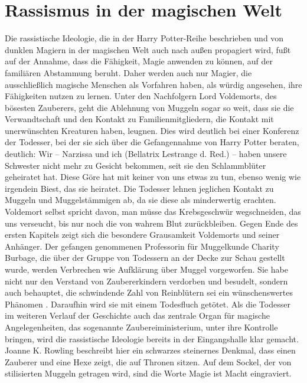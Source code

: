 \section{Rassismus in der magischen Welt}
Die rassistische Ideologie, die in der \glqq Harry Potter\grqq-Reihe beschrieben und von dunklen Magiern in der magischen Welt auch nach außen propagiert wird, fußt auf der Annahme, dass die Fähigkeit, Magie anwenden zu können, auf der familiären Abstammung beruht.
Daher werden auch nur Magier, die ausschließlich magische Menschen als Vorfahren haben, als würdig angesehen, ihre Fähigkeiten nutzen zu lernen.
Unter den Nachfolgern Lord Voldemorts, des bösesten Zauberers, geht die Ablehnung von Muggeln sogar so weit, dass sie die Verwandtschaft und den Kontakt zu Familienmitgliedern, die Kontakt mit \glqq unerwünschten\grqq{} Kreaturen haben, leugnen.
Dies wird deutlich bei einer Konferenz der Todesser, bei der sie sich über die Gefangennahme von Harry Potter beraten, deutlich: \glqq Wir – Narzissa und ich (Bellatrix Lestrange d. Red.) – haben unsere Schwester nicht mehr zu Gesicht bekommen, seit sie den Schlammblüter geheiratet hat. Diese Göre hat mit keiner von uns etwas zu tun, ebenso wenig wie irgendein Biest, das sie heiratet.\grqq{}\cite[S.18]{JKR10}
Die Todesser lehnen jeglichen Kontakt zu Muggeln und Muggelstämmigen ab, da sie diese als minderwertig erachten.
Voldemort selbst spricht davon, man müsse \glqq das Krebsgeschwür wegschneiden, das uns verseucht, bis nur noch die von wahrem Blut zurückbleiben.\grqq{}\cite[S.19]{JKR10} 
Gegen Ende des ersten Kapitels zeigt sich die besondere Grausamkeit Voldemorts und seiner Anhänger. 
Der gefangen genommenen Professorin für \glqq Muggelkunde\grqq{} Charity Burbage, die über der Gruppe von Todessern an der Decke zur Schau gestellt wurde, werden \glqq Verbrechen\grqq{} wie Aufklärung über Muggel vorgeworfen. 
Sie habe nicht nur \glqq den Verstand von Zaubererkindern\grqq{} verdorben und besudelt, sondern auch behauptet, die schwindende Zahl von Reinblütern sei ein \glqq wünschenswertes Phänomen\grqq{} \cite[S.19]{JKR10}. 
Daraufhin wird sie mit einem Todesfluch getötet.
Als die Todesser im weiteren Verlauf der Geschichte auch das zentrale Organ für magische Angelegenheiten, das sogenannte Zaubereiministerium, unter ihre Kontrolle bringen, wird die rassistische Ideologie bereits in der Eingangshalle klar gemacht.
Joanne K. Rowling beschreibt hier ein schwarzes steinernes Denkmal, dass einen Zauberer und eine Hexe zeigt, die auf Thronen sitzen.\cite[S.249]{JKR10} 
Auf dem Sockel, der von stilisierten Muggeln getragen wird, sind die Worte \glqq Magie ist Macht\grqq{} eingraviert. 
